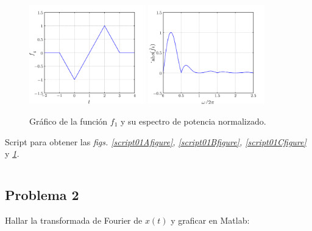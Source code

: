 \documentclass[a4paper,12pt,final]{article}
\begin{document}
      \begin{figure}[H]
        \caption{Gráfico de la función $f_1$ y su espectro de potencia normalizado.}
        \label{script01Dfigure}
        \begin{center}
          \includegraphics[width=0.45\textwidth]{./laboratorio_4/problema01_f4.png}
          \includegraphics[width=0.45\textwidth]{./laboratorio_4/problema01_F4.png}
        \end{center}
      \end{figure}

      \begin{listing}[H]
        \caption{Script para obtener las \emph{figs. \ref{script01Afigure}, \ref{script01Bfigure}, \ref{script01Cfigure}} y \emph{\ref{script01Dfigure}.}}
        \label{script01G}
        \inputminted{matlab}{./laboratorio_4/problema01.m}
      \end{listing}\vspace{-1.0em}

  \newpage
  \subsection*{Problema 2}

    \noindent Hallar la transformada de Fourier de $x\left(t\right)$ y graficar en Matlab:
\end{document}
